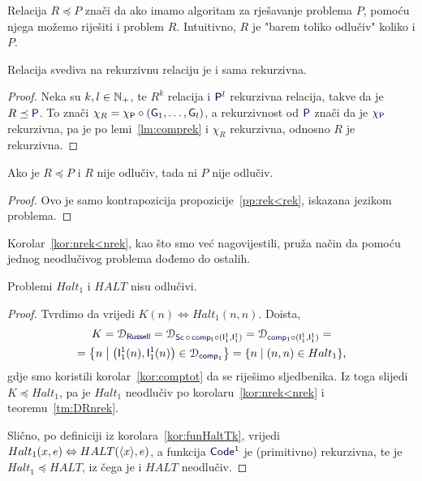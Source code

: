 Relacija $R\preceq P$ znači da ako imamo algoritam za rješavanje problema $P$, pomoću njega možemo riješiti i problem $R$. Intuitivno, $R$ je "barem toliko odlučiv" koliko i $P$.

\begin{propozicija}[{name=[svedivost čuva rekurzivnost]}]\label{pp:rek<rek}
Relacija svediva na rekurzivnu relaciju je i sama rekurzivna.
\end{propozicija}
\begin{proof}
Neka su $k,l\in{\mathbb N}_+$, te $R^k$ relacija i $\f P^l$ rekurzivna relacija, takve da je $R\preceq\f P$. To znači $\chi_R=\chi_{\f P}\circ(\f G_1,\dotsc,\f G_l)$, a rekurzivnost od $\f P$ znači da je $\chi_{\f P}$ rekurzivna, pa je po lemi~\ref{lm:comprek} i $\chi_R$ rekurzivna, odnosno $R$ je rekurzivna.
\end{proof}

\begin{korolar}[{name=[inverz svedivosti čuva neodlučivost]}]\label{kor:nrek<nrek}
Ako je $R\preceq P$ i $R$ nije odlučiv, tada ni $P$ nije odlučiv.
\end{korolar}
\begin{proof}
Ovo je samo kontrapozicija propozicije~\ref{pp:rek<rek}, iskazana jezikom problema.
\end{proof}


Korolar~\ref{kor:nrek<nrek}, kao što smo već nagovijestili, pruža način da pomoću jednog neodlučivog problema dođemo do ostalih.

\begin{propozicija}[{name=[neodlučivost problema zaustavljanja za RAM-strojeve]}]\label{pp:Haltnodl}
Problemi $Halt_1$ i $HALT$ nisu odlučivi.
\end{propozicija}
\begin{proof}
Tvrdimo da vrijedi $K(n)\Leftrightarrow Halt_1(n,n)$. Doista,
\begin{multline}
    K=\dom{\f{Russell}}=\dom{\f{Sc}\,\circ\,\f{comp_1}\circ(\f I_1^1,\f I_1^1)}=\dom{\f{comp}_1\circ(\f I_1^1,\f I_1^1)}=\\
    =\left\{n\;\middle\vert\;\bigl(\f I_1^1(n),\f I_1^1(n)\bigr)\in\dom{\f{comp}_1}\right\}
    =\{n\mid(n,n)\in Halt_1\}\text,
\end{multline}
gdje smo koristili korolar~\ref{kor:comptot} da se riješimo sljedbenika. Iz toga slijedi $K\preceq Halt_1$, pa je $Halt_1$ neodlučiv po korolaru~\ref{kor:nrek<nrek} i teoremu~\ref{tm:DRnrek}.

Slično, po definiciji iz korolara~\ref{kor:funHaltTk}, vrijedi $Halt_1(x,e)\Leftrightarrow HALT(\langle x\rangle,e)$, a funkcija $\f{Code}^1$ je (primitivno) rekurzivna, te je $Halt_1\!\preceq HALT$, iz čega je i $HALT$ neodlučiv.
\end{proof}


